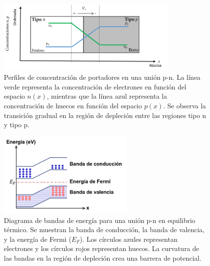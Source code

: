 \documentclass[
    10pt,
    aspectratio=169,
    xcolor={dvipsnames},
    spanish,
    ]{beamer}
\begin{document}
\begin{frame}
  
    \begin{figure}[H]
        \centering
        \includegraphics[width=0.8\textwidth]{../figures/Auxiliar_2_9}
        \caption{Perfiles de concentración de portadores en una unión p-n. La línea verde representa la concentración de electrones en función del espacio $n(x)$, mientras que la línea azul representa la concentración de huecos en función del espacio $p(x)$. Se observa la transición gradual en la región de depleción entre las regiones tipo n y tipo p.}
        \label{fig:concentraciones_pn}
    \end{figure}
\end{frame}
\begin{frame}
    \begin{figure}[H]
        \centering
        \includegraphics[width=0.6\textwidth]{../figures/Auxiliar_2_10}
        \caption{Diagrama de bandas de energía para una unión p-n en equilibrio térmico. Se muestran la banda de conducción, la banda de valencia, y la energía de Fermi ($E_F$). Los círculos azules representan electrones y los círculos rojos representan huecos. La curvatura de las bandas en la región de depleción crea una barrera de potencial.}
        \label{fig:bandas_pn}
    \end{figure}
\end{frame}

\end{document}
